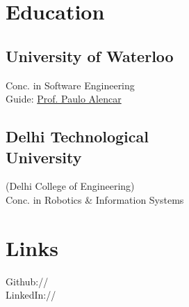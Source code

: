 \documentclass[]{Vishnu-Resume}
\begin{document}
%
%
\lastupdated

%
%


%
%

\begin{minipage}[t]{0.33\textwidth} 


\section{Education} 

\subsection{University of Waterloo}
Conc. in Software Engineering \\
Guide: \href{https://cs.uwaterloo.ca/about/people/palencar}{Prof. Paulo Alencar}\\
\sectionsep

\subsection{Delhi Technological \\University}
(Delhi College of Engineering)\\
Conc. in Robotics \& Information Systems \\
\sectionsep


\section{Links} 
Github:// \href{https://github.com/zxingz}{} \\
LinkedIn://  \href{www.linkedin.com/in/zxingz/}{} \\
\sectionsep


\end{minipage}
\end{document}
